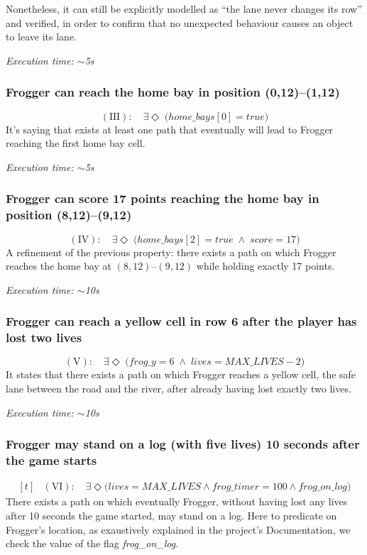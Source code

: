 \documentclass[a4paper]{article}
\begin{document}
Nonetheless, it can still be explicitly modelled as ``the lane never changes 
its row'' and verified, in order to confirm that no unexpected behaviour causes 
an object to leave its lane.

\hfill \textit{Execution time: $\sim$5s}

\subsubsection*{Frogger can reach the home bay in position (0,12)–(1,12)}
\[ (\textrm{III}) : \quad \exists \Diamond \; \big(home\_bays[0] = true \big) \]
It's saying that exists at least one path that eventually will lead to 
Frogger reaching the first home bay cell.

\hfill \textit{Execution time: $\sim$5s}

\subsubsection*{Frogger can score 17 points reaching the home bay in position (8,12)–(9,12)}
\[ (\textrm{IV}) : \quad \exists \Diamond \; \big(  home\_bays[2] = true 
   \;\wedge\; \textit{score} = 17 \big) \]
A refinement of the previous property: there exists a path on which Frogger 
reaches the home bay at $(8,12)$--$(9,12)$ while holding exactly 17 points.

\hfill \textit{Execution time: $\sim$10s}

\subsubsection*{Frogger can reach a yellow cell in row 6 after the player has lost two lives}
\[ (\textrm{V}) : \quad \exists \Diamond \; \big( \textit{frog\_y} = 6 
   \;\wedge\; \textit{lives} = \textit{MAX\_LIVES} - 2 \big) \]
It states that there exists a path on which Frogger
reaches a yellow cell, the safe lane
between the road and the river, after already having
lost exactly two lives.

\hfill \textit{Execution time: $\sim$10s}

\subsubsection*{Frogger may stand on a log (with five lives) 10 seconds
after the game starts}
\[
\begin{aligned}[t]
& (\textrm{VI}) : \quad \exists \Diamond \big( \textit{lives} =
   \textit{MAX\_LIVES} \wedge \textit{frog\_timer} = 100 \wedge
   \textit{frog\_on\_log}\big)
\end{aligned}
\]
There exists a path on which eventually Frogger, without having lost
any lives after 10 seconds the game started, may stand on a log.
Here to predicate on Frogger's location, as exaustively explained in the 
project's Documentation, we check the value of the flag \textit{frog\_on\_log}.
\end{document}
